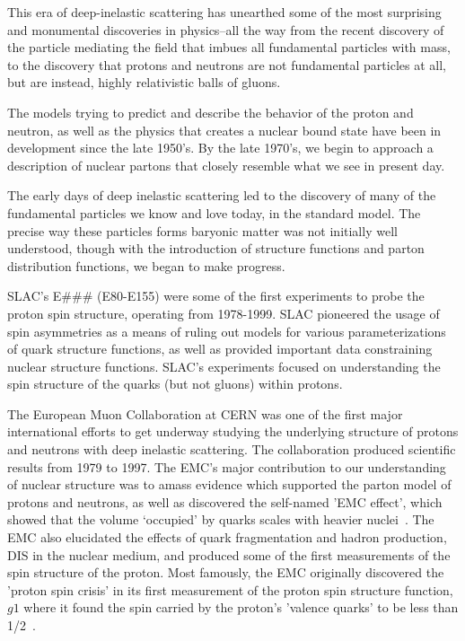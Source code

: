This era of deep-inelastic scattering has unearthed some of the most surprising
and monumental discoveries in physics--all the way from the recent discovery of
the particle mediating the field that imbues all fundamental particles with
mass, to the discovery that protons and neutrons are not fundamental particles
at all, but are instead, highly relativistic balls of gluons.

The models trying to predict and describe the behavior of the proton and
neutron, as well as the physics that creates a nuclear bound state have been in
development since the late 1950's. By the late 1970's, we begin to approach a
description of nuclear partons that closely resemble what we see in present day.

The early days of deep inelastic scattering led to the discovery of many of the
fundamental particles we know and love today, in the standard model. The
precise way these particles forms baryonic matter was not initially well
understood, though with the introduction of structure functions and parton
distribution functions, we began to make progress.


SLAC's E\#\#\# (E80-E155) were some of the first experiments to probe the proton
spin structure, operating from 1978-1999. SLAC pioneered the usage of spin
asymmetries as a means of ruling out models for various parameterizations of
quark structure functions, as well as provided important data constraining
nuclear structure functions. SLAC's experiments focused on understanding the
spin structure of the quarks (but not gluons) within protons.

The European Muon Collaboration at CERN was one of the first major international
efforts to get underway studying the underlying structure of protons and
neutrons with deep inelastic scattering. The collaboration produced scientific
results from 1979 to 1997. The EMC's major contribution to our understanding of
nuclear structure was to amass evidence which supported the parton model of
protons and neutrons, as well as discovered the self-named 'EMC effect', which
showed that the volume `occupied' by quarks scales with heavier
nuclei~\cite{Aubert1983}. The EMC also elucidated the effects of quark
fragmentation and hadron production, DIS in the nuclear medium, and produced
some of the first measurements of the spin structure of the proton. Most
famously, the EMC originally discovered the 'proton spin crisis' in its first
measurement of the proton spin structure function, $g1$ where it found the spin
carried by the proton's 'valence quarks' to be less than 1/2~\cite{Ashman1988}. 

